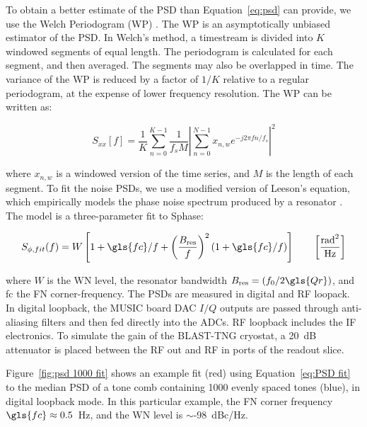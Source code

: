 To obtain a better estimate of the PSD than Equation~\ref{eq:psd} can provide, we use the Welch Periodogram (WP) \citep{welch1967use}. The WP is an asymptotically unbiased estimator of the PSD. In Welch's method, a timestream is divided into $K$ windowed segments of equal length. The periodogram is calculated for each segment, and then averaged. The segments may also be overlapped in time. The variance of the WP is reduced by a factor of $1/K$ relative to a regular periodogram, at the expense of lower frequency resolution. The WP can be written as:

\begin{equation}\label{eq:WP}
S_{xx}[f] = \frac{1}{K} \sum_{n=0}^{K - 1}\frac{1}{f_{s} M} \left| \sum_{n=0}^{N - 1} x_{n,w} e^{-j2\pi f n / f_{s} }\right|^{2}
\end{equation}

where $x_{n,w}$ is a windowed version of the time series, and $M$ is the length of each segment. To fit the noise PSDs, we use a modified version of Leeson's equation, which empirically models the phase noise spectrum produced by a resonator \citep{lesson1966simple}. The model is a three-parameter fit to \gls{Sphase}:

\begin{equation}\label{eq:PSD fit}
  S_{\phi,fit}(f) = W\left[ 1 + \gls{fc}/f + \left( \frac{B_{\mathrm{res}}}{f} \right)^{2} (1 + \gls{fc}/f) \right] \qquad \left[  \frac{\mathrm{rad}^{2}}{\mathrm{Hz}} \right]
\end{equation}

where $W$ is the WN level, the resonator bandwidth $B_{\mathrm{res}} = (f_{0}/2\gls{Qr})$, and \gls{fc} the FN corner-frequency. The PSDs are measured in digital and RF loopack. In digital loopback, the MUSIC board DAC $I/Q$ outputs are passed through anti-aliasing filters and then fed directly into the ADCs. RF loopback includes the IF electronics. To simulate the gain of the BLAST-TNG cryostat, a 20~dB attenuator is placed between the RF out and RF in ports of the readout slice.

Figure~\ref{fig:psd 1000 fit} shows an example fit (red) using Equation~\ref{eq:PSD fit} to the median PSD of a tone comb containing 1000 evenly spaced tones (blue), in digital loopback mode. In this particular example, the FN corner frequency $\gls{fc} \approx 0.5$~Hz, and the WN level is $\sim$-98~dBc/Hz.

